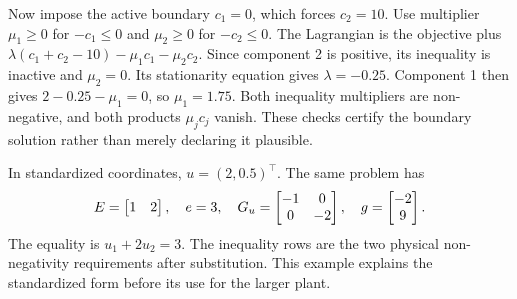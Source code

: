 Now impose the active boundary $c_1=0$, which forces $c_2=10$. Use multiplier $\mu_1\ge0$ for $-c_1\le0$ and $\mu_2\ge0$ for $-c_2\le0$. The Lagrangian is the objective plus $\lambda(c_1+c_2-10)-\mu_1c_1-\mu_2c_2$. Since component 2 is positive, its inequality is inactive and $\mu_2=0$. Its stationarity equation gives $\lambda=-0.25$. Component 1 then gives $2-0.25-\mu_1=0$, so $\mu_1=1.75$. Both inequality multipliers are non-negative, and both products $\mu_jc_j$ vanish. These checks certify the boundary solution rather than merely declaring it plausible.

In standardized coordinates, $u=(2,0.5)^\top$. The same problem has
\begin{equation}
\equationname{Standardized matrices of the illustrative two-component projection}
E=\begin{bmatrix}1&2\end{bmatrix},\quad e=3,\quad
G_u=\begin{bmatrix}-1&0\\0&-2\end{bmatrix},\quad
g=\begin{bmatrix}-2\\9\end{bmatrix}.
\end{equation}
The equality is $u_1+2u_2=3$. The inequality rows are the two physical non-negativity requirements after substitution. This example explains the standardized form before its use for the larger plant.

